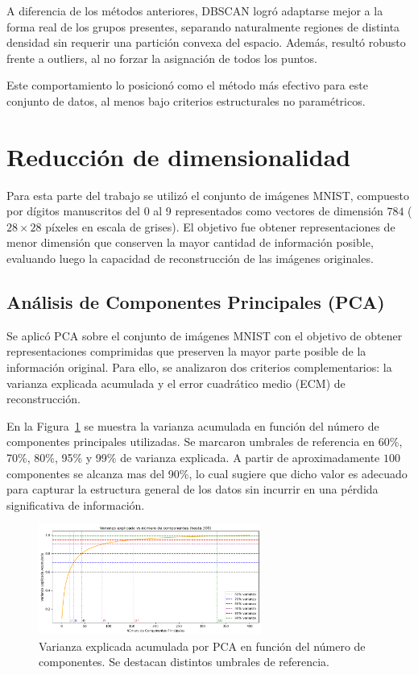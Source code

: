 \documentclass[11pt]{article}
\begin{document}
A diferencia de los métodos anteriores, DBSCAN logró adaptarse mejor a la forma real de los grupos presentes, separando naturalmente regiones de distinta densidad sin requerir una partición convexa del espacio. Además, resultó robusto frente a outliers, al no forzar la asignación de todos los puntos.

Este comportamiento lo posicionó como el método más efectivo para este conjunto de datos, al menos bajo criterios estructurales no paramétricos.

\section{Reducción de dimensionalidad}

Para esta parte del trabajo se utilizó el conjunto de imágenes MNIST, compuesto por dígitos manuscritos del 0 al 9 representados como vectores de dimensión $784$ ($28 \times 28$ píxeles en escala de grises). El objetivo fue obtener representaciones de menor dimensión que conserven la mayor cantidad de información posible, evaluando luego la capacidad de reconstrucción de las imágenes originales.

\subsection*{Análisis de Componentes Principales (PCA)}

Se aplicó PCA sobre el conjunto de imágenes MNIST con el objetivo de obtener representaciones comprimidas que preserven la mayor parte posible de la información original. Para ello, se analizaron dos criterios complementarios: la varianza explicada acumulada y el error cuadrático medio (ECM) de reconstrucción.

En la Figura~\ref{fig:pca_variance_plot} se muestra la varianza acumulada en función del número de componentes principales utilizadas. Se marcaron umbrales de referencia en 60\%, 70\%, 80\%, 95\% y 99\% de varianza explicada. A partir de aproximadamente $100$ componentes se alcanza mas del 90\%, lo cual sugiere que dicho valor es adecuado para capturar la estructura general de los datos sin incurrir en una pérdida significativa de información.

\begin{figure}[H]
    \centering
    \includegraphics[width=0.65\textwidth]{figures/pca_variance_explained.png}
    \caption{Varianza explicada acumulada por PCA en función del número de componentes. Se destacan distintos umbrales de referencia.}
    \label{fig:pca_variance_plot}
\end{figure}
\end{document}

